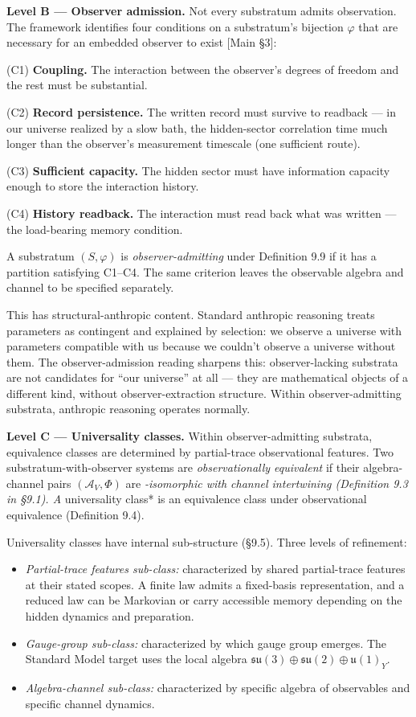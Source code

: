 \documentclass[
]{article}
\providecommand{\tightlist}{%
  \setlength{\itemsep}{0pt}\setlength{\parskip}{0pt}}
\begin{document}
\textbf{Level B --- Observer admission.} Not every substratum admits
observation. The framework identifies four conditions on a substratum's
bijection \(\varphi\) that are necessary for an embedded observer to
exist {[}Main §3{]}:

(C1) \textbf{Coupling.} The interaction between the observer's degrees
of freedom and the rest must be substantial.

(C2) \textbf{Record persistence.} The written record must survive to
readback --- in our universe realized by a slow bath, the hidden-sector
correlation time much longer than the observer's measurement timescale
(one sufficient route).

(C3) \textbf{Sufficient capacity.} The hidden sector must have
information capacity enough to store the interaction history.

(C4) \textbf{History readback.} The interaction must read back what was
written --- the load-bearing memory condition.

A substratum \((S,\varphi)\) is \emph{observer-admitting} under
Definition 9.9 if it has a partition satisfying C1--C4. The same
criterion leaves the observable algebra and channel to be specified
separately.

This has structural-anthropic content. Standard anthropic reasoning
treats parameters as contingent and explained by selection: we observe a
universe with parameters compatible with us because we couldn't observe
a universe without them. The observer-admission reading sharpens this:
observer-lacking substrata are not candidates for ``our universe'' at
all --- they are mathematical objects of a different kind, without
observer-extraction structure. Within observer-admitting substrata,
anthropic reasoning operates normally.

\textbf{Level C --- Universality classes.} Within observer-admitting
substrata, equivalence classes are determined by partial-trace
observational features. Two substratum-with-observer systems are
\emph{observationally equivalent} if their algebra-channel pairs
\((\mathcal{A}_V, \Phi)\) are \emph{-isomorphic with channel
intertwining (Definition 9.3 in §9.1). A }universality class* is an
equivalence class under observational equivalence (Definition 9.4).

Universality classes have internal sub-structure (§9.5). Three levels of
refinement:

\begin{itemize}
\tightlist
\item
  \emph{Partial-trace features sub-class:} characterized by shared
  partial-trace features at their stated scopes. A finite law admits a
  fixed-basis representation, and a reduced law can be Markovian or
  carry accessible memory depending on the hidden dynamics and
  preparation.
\item
  \emph{Gauge-group sub-class:} characterized by which gauge group
  emerges. The Standard Model target uses the local algebra
  \(\mathfrak{su}(3)\oplus\mathfrak{su}(2)\oplus\mathfrak u(1)_Y\).
\item
  \emph{Algebra-channel sub-class:} characterized by specific algebra of
  observables and specific channel dynamics.
\end{itemize}
\end{document}
